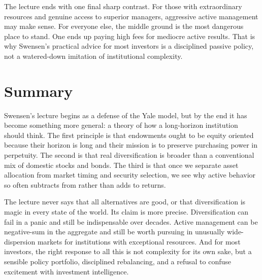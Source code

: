 The lecture ends with one final sharp contrast. For those with extraordinary resources and genuine access to superior managers, aggressive active management may make sense. For everyone else, the middle ground is the most dangerous place to stand. One ends up paying high fees for mediocre active results. That is why Swensen's practical advice for most investors is a disciplined passive policy, not a watered-down imitation of institutional complexity.

\section{Summary}

Swensen's lecture begins as a defense of the Yale model, but by the end it has become something more general: a theory of how a long-horizon institution should think. The first principle is that endowments ought to be equity oriented because their horizon is long and their mission is to preserve purchasing power in perpetuity. The second is that real diversification is broader than a conventional mix of domestic stocks and bonds. The third is that once we separate asset allocation from market timing and security selection, we see why active behavior so often subtracts from rather than adds to returns.

The lecture never says that all alternatives are good, or that diversification is magic in every state of the world. Its claim is more precise. Diversification can fail in a panic and still be indispensable over decades. Active management can be negative-sum in the aggregate and still be worth pursuing in unusually wide-dispersion markets for institutions with exceptional resources. And for most investors, the right response to all this is not complexity for its own sake, but a sensible policy portfolio, disciplined rebalancing, and a refusal to confuse excitement with investment intelligence.